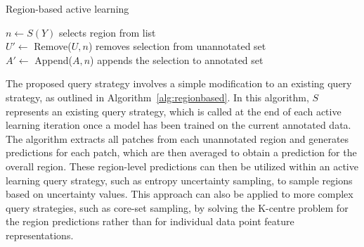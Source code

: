 \begin{algorithm}
	\caption{Region-based active learning}
	\label{alg:regionbased}
	{
		$n \gets S(Y)$ \hfill selects region from list\\
		$U' \gets$ Remove($U, n$) \hfill removes selection from unannotated set\\
		$A' \gets$ Append($A, n$) \hfill appends the selection to annotated set\\
	}
\end{algorithm}

The proposed query strategy involves a simple modification to an existing query strategy, as outlined in Algorithm~\ref{alg:regionbased}. In this algorithm, $S$ represents an existing query strategy, which is called at the end of each active learning iteration once a model has been trained on the current annotated data. The algorithm extracts all patches from each unannotated region and generates predictions for each patch, which are then averaged to obtain a prediction for the overall region. These region-level predictions can then be utilized within an active learning query strategy, such as entropy uncertainty sampling, to sample regions based on uncertainty values. This approach can also be applied to more complex query strategies, such as core-set sampling, by solving the K-centre problem for the region predictions rather than for individual data point feature representations.



